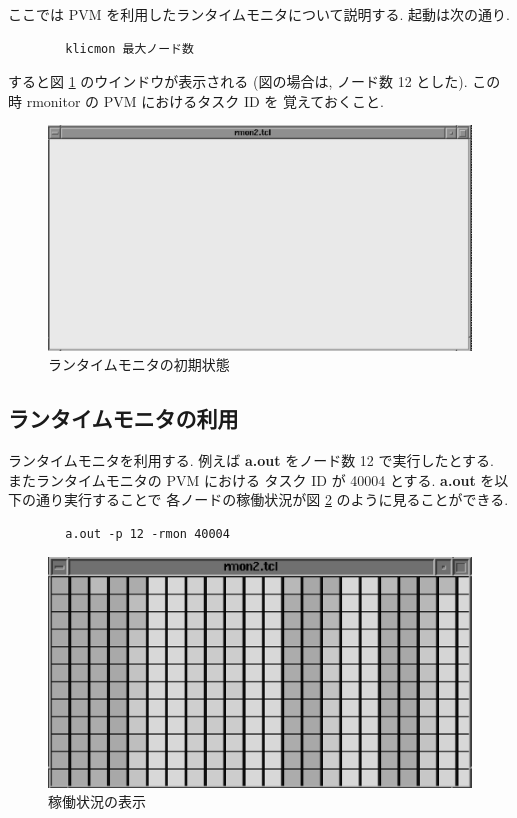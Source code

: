\documentclass[a4,titlepage]{jsreport}
\begin{document}
ここでは PVM を利用したランタイムモニタについて説明する.  
起動は次の通り.

\begin{Verbatim}
        klicmon 最大ノード数
\end{Verbatim}

すると図 \ref{rmon-empty} のウインドウが表示される (図の場合は,
ノード数 12 とした).  この時 rmonitor の PVM におけるタスク ID を
覚えておくこと.

\begin{figure}[htb]
\begin{center}
\includegraphics[width=.8\textwidth]{fig/rmon5.ps}
\end{center}
\caption{ランタイムモニタの初期状態}\label{rmon-empty}
\end{figure}

\subsection{ランタイムモニタの利用}

ランタイムモニタを利用する.  例えば {\bf a.out} をノード数 
12 で実行したとする.  またランタイムモニタの PVM における
タスク ID が 40004 とする.  {\bf a.out} を以下の通り実行することで
各ノードの稼働状況が図 \ref{rmon-exec} のように見ることができる.

\begin{Verbatim}
        a.out -p 12 -rmon 40004
\end{Verbatim}

\begin{figure}[hbt]
\begin{center}
\includegraphics[width=.8\textwidth]{fig/rmon3.ps}
\end{center}
\caption{稼働状況の表示}\label{rmon-exec}
\end{figure}
\end{document}
